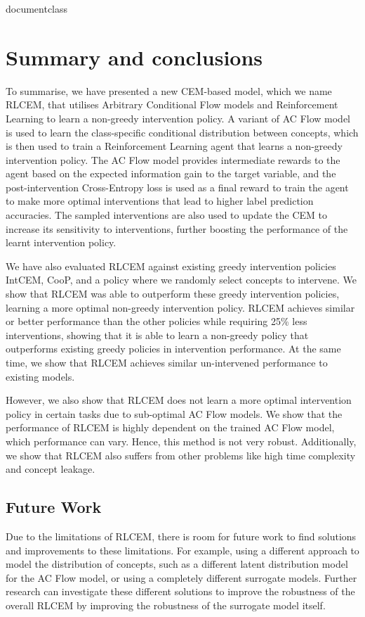 \csname documentclass

\chapter{Summary and conclusions}\label{chapter-5}

To summarise, we have presented a new CEM-based model,
which we name RLCEM, that utilises Arbitrary Conditional Flow 
models and Reinforcement Learning to learn a non-greedy 
intervention policy. A variant of AC Flow model is used to 
learn the class-specific
conditional distribution between concepts, which is then used 
to train a Reinforcement Learning agent that learns
a non-greedy intervention policy. The AC Flow model 
provides intermediate rewards to the agent based on the
expected information gain to the target variable,
and the post-intervention Cross-Entropy loss is used as a final reward
to train the agent to make more optimal 
interventions that lead to 
higher label prediction accuracies. The sampled interventions
are also used to update the CEM to increase its sensitivity
to interventions, further boosting the performance of the learnt
intervention policy.

We have also evaluated RLCEM against existing greedy intervention
policies IntCEM, CooP, and a policy where we randomly select
concepts to intervene. We show that RLCEM was able to outperform 
these greedy intervention policies, learning a more optimal
non-greedy intervention policy. RLCEM achieves similar or 
better performance than the other policies while requiring
25\% less interventions, 
showing that it is able to learn a non-greedy policy that 
outperforms existing greedy policies in intervention
performance. At the same time,
we show that RLCEM achieves similar un-intervened performance
to existing models.

However, we also show that RLCEM
does not learn a more optimal intervention policy
in certain tasks due to sub-optimal AC Flow models.
We show that the performance of RLCEM is highly dependent on
the trained AC Flow model, which performance can vary. 
Hence, this method
is not very robust. Additionally, we show that 
RLCEM also suffers from other problems like 
high time complexity and concept leakage.

\section{Future Work}
Due to the limitations of RLCEM, there is room for future 
work to find solutions and improvements to these limitations.
For example, using a different approach to model
the distribution of concepts, such as 
a different latent distribution model for the AC Flow model,
or using a completely different surrogate models. Further 
research can investigate these different solutions to 
improve the robustness of the overall RLCEM 
by improving the robustness of the surrogate model itself.

